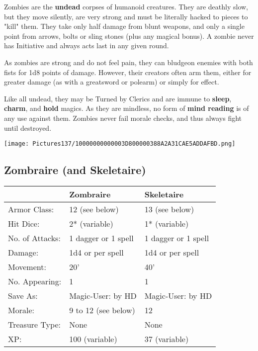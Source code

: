 \documentclass[a4paper,twoside,openany,10pt]{book}
\begin{document}
\begin{multicols}{2}
Zombies are the \textbf{undead} corpses of humanoid creatures. They are deathly slow, but they move silently, are very strong and must be literally hacked to pieces to "kill" them. They take only half damage from blunt weapons, and only a single point from arrows, bolts or sling stones (plus any magical bonus). A zombie never has Initiative and always acts last in any given round.

As zombies are strong and do not feel pain, they can bludgeon enemies with both fists for 1d8 points of damage. However, their creators often arm them, either for greater damage (as with a greatsword or polearm) or simply for effect.

Like all undead, they may be Turned by Clerics and are immune to \textbf{sleep}, \textbf{charm},\textbf{ }and \textbf{hold} magics. As they are mindless, no form of \textbf{mind reading} is of any use against them. Zombies never fail morale checks, and thus always fight until destroyed.

\begin{center} \texttt{[image: Pictures137/10000000000003D800000388A2A31CAE5ADDAFBD.png]} \end{center}

\subsection*{Zombraire (and Skeletaire)}\label{zombraire-and-skeletaire}

\begin{tabularx}{0.50\textwidth}{@{}lXX@{}}
& Zombraire & Skeletaire \\\hline
Armor Class: & 12 (see below) & 13 (see below) \\\hline
Hit Dice: & 2* (variable) & 1* (variable) \\\hline
No. of Attacks: & 1 dagger or 1 spell & 1 dagger or 1 spell \\\hline
Damage: & 1d4 or per spell & 1d4 or per spell \\\hline
Movement: & 20' & 40' \\\hline
No. Appearing: & 1 & 1 \\\hline
Save As: & Magic-User: by HD & Magic-User: by HD \\\hline
Morale: & 9 to 12 (see below) & 12 \\\hline
Treasure Type: & None & None \\\hline
XP: & 100 (variable) & 37 (variable) \\\hline
\end{tabularx}\medskip


\end{multicols}
\end{document}
